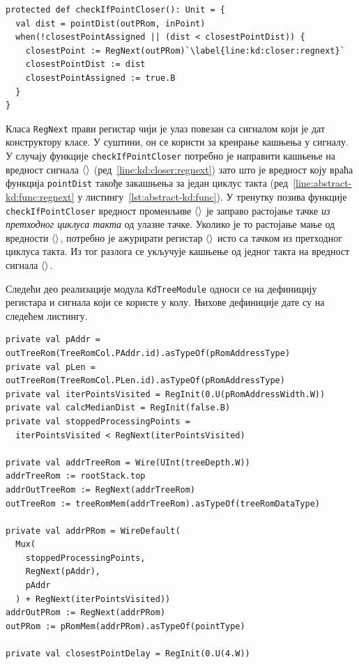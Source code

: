 \documentclass[master]{finthesis}
\newcommand*{\correctmath}[1]{%
    \ifcsname mathCorrectionFor#1\endcsname%
        \csname mathCorrectionFor#1\endcsname%
    \else%
        #1%
    \fi%
}
\newcommand*{\mfield}[1]{{\langle\correctmath{#1}\/\rangle}}
\newcommand*{\field}[1]{\texorpdfstring{$\mfield{#1}$}{⟨#1⟩}}
\newcommand*{\prog}[1]{\texttt{#1}}
\newcommand*{\func}[1]{\prog{#1}}
\begin{document}
\begin{lstlisting}[style=Chisel, caption={Реализација функције \func{checkIfPointCloser}.}, label={lst:kd:closer}]
protected def checkIfPointCloser(): Unit = {
  val dist = pointDist(outPRom, inPoint)
  when(!closestPointAssigned || (dist < closestPointDist)) {
    closestPoint := RegNext(outPRom)`\label{line:kd:closer:regnext}`
    closestPointDist := dist
    closestPointAssigned := true.B
  }
}
\end{lstlisting}

Класа \prog{RegNext} прави регистар чији је улаз повезан са сигналом који је дат конструктору класе. У суштини, он се користи за креирање кашњења у сигналу. У случају функције \func{checkIfPointCloser} потребно је направити кашњење на вредност сигнала \field{outPRom} (ред~\ref{line:kd:closer:regnext}) зато што је вредност коју враћа функција \func{pointDist} такође закашњења за један циклус такта (ред~\ref{line:abstract-kd:func:regnext} у листингу~\ref{lst:abstract-kd:func}). У тренутку позива функције \func{checkIfPointCloser} вредност променљиве \field{dist} је заправо растојање тачке \emph{из претходног циклуса такта} од улазне тачке. Уколико је то растојање мање од вредности \field{closestPointDist}, потребно је ажурирати регистар \field{closestPoint} исто са тачком из претходног циклуса такта. Из тог разлога се укључује кашњење од једног такта на вредност сигнала \field{outPRom}.

Следећи део реализације модула \prog{KdTreeModule} односи се на дефиницију регистара и сигнала који се користе у колу. Њихове дефиниције дате су на следећем листингу.

\begin{lstlisting}[style=Chisel, caption={Дефиниције регистара и сигнала модула \prog{KdTreeModule}.}, label={lst:kd:regs}]
private val pAddr = outTreeRom(TreeRomCol.PAddr.id).asTypeOf(pRomAddressType)
private val pLen = outTreeRom(TreeRomCol.PLen.id).asTypeOf(pRomAddressType)
private val iterPointsVisited = RegInit(0.U(pRomAddressWidth.W))
private val calcMedianDist = RegInit(false.B)
private val stoppedProcessingPoints =
  iterPointsVisited < RegNext(iterPointsVisited)

private val addrTreeRom = Wire(UInt(treeDepth.W))
addrTreeRom := rootStack.top
addrOutTreeRom := RegNext(addrTreeRom)
outTreeRom := treeRomMem(addrTreeRom).asTypeOf(treeRomDataType)

private val addrPRom = WireDefault(
  Mux(
    stoppedProcessingPoints,
    RegNext(pAddr),
    pAddr
  ) + RegNext(iterPointsVisited))
addrOutPRom := RegNext(addrPRom)
outPRom := pRomMem(addrPRom).asTypeOf(pointType)

private val closestPointDelay = RegInit(0.U(4.W))
\end{lstlisting}
\end{document}
